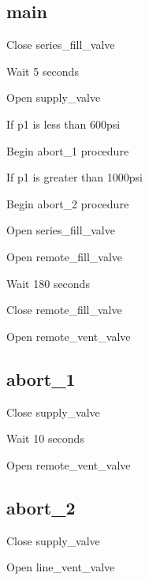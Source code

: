 \subsection{main}
\begin{checklist}
    \item \PRIMARY{} Close series\_fill\_valve
    \item Wait 5 seconds
    \item \PRIMARY{} Open supply\_valve
    \item If p1 is less than 600psi
    \begin{checklist}
        \item Begin abort\_1 procedure
    \end{checklist}
    \item If p1 is greater than 1000psi
    \begin{checklist}
        \item Begin abort\_2 procedure
    \end{checklist}
    \item \PRIMARY{} Open series\_fill\_valve
    \item \PRIMARY{} Open remote\_fill\_valve
    \item Wait 180 seconds
    \item \PRIMARY{} Close remote\_fill\_valve
    \item \PRIMARY{} Open remote\_vent\_valve
\end{checklist}

\subsection{abort\_1}
\begin{checklist}
    \item \SECONDARY{} Close supply\_valve
    \item Wait 10 seconds
    \item \SECONDARY{} Open remote\_vent\_valve
\end{checklist}

\subsection{abort\_2}
\begin{checklist}
    \item \CONTROL{} Close supply\_valve
    \item \CONTROL{} Open line\_vent\_valve
\end{checklist}

